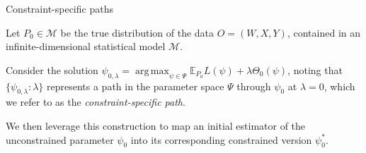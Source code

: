 \documentclass[12pt,t,handout]{beamer}
\newcommand{\E}{\mathbb{E}}
\DeclareMathOperator*{\argmax}{arg\,max}
\begin{document}

\begin{frame}[c]{Constraint-specific paths}

\begin{center}

Let $P_0 \in \mathcal{M}$ be the true distribution of the data $O = (W, X, Y)$,
contained in an infinite-dimensional statistical model $\mathcal{M}$.

\vspace{1em}

Consider the solution $\psi_{0, \lambda} = \argmax_{\psi \in \Psi}
\E_{P_0}L(\psi) + \lambda \Theta_0(\psi)$, noting that $\{\psi_{0, \lambda} :
\lambda\}$ represents a path in the parameter space $\Psi$ through $\psi_0$ at
$\lambda = 0$, which we refer to as the \textit{constraint-specific path}.

\vspace{1em}

We then leverage this construction to map an initial estimator of the
unconstrained parameter $\psi_0$ into its corresponding constrained version
$\psi_0^*$.

\end{center}

\note{
}

\end{frame}

\end{document}
